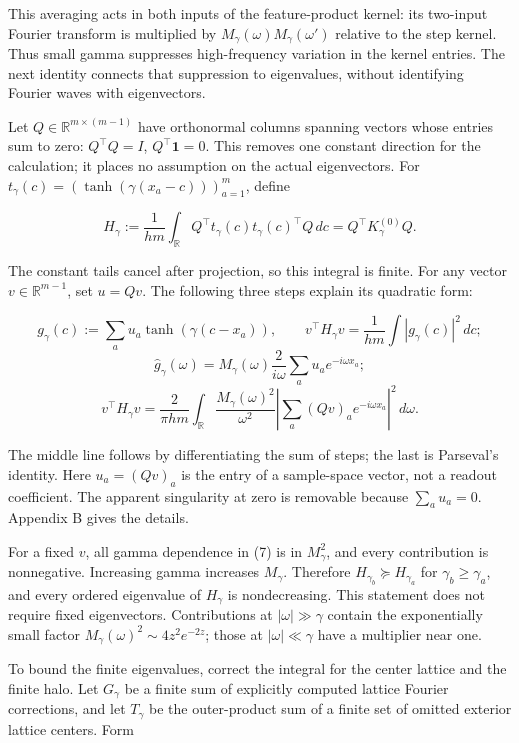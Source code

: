 \documentclass[11pt]{article}
\begin{document}
This averaging acts in both inputs of the feature-product kernel: its two-input Fourier transform is multiplied by \(M_\gamma(\omega)M_\gamma(\omega')\) relative to the step kernel. Thus small gamma suppresses high-frequency variation in the kernel entries. The next identity connects that suppression to eigenvalues, without identifying Fourier waves with eigenvectors.

Let \(Q\in\mathbb R^{m\times(m-1)}\) have orthonormal columns spanning vectors whose entries sum to zero: \(Q^\top Q=I\), \(Q^\top\mathbf1=0\). This removes one constant direction for the calculation; it places no assumption on the actual eigenvectors. For \(t_\gamma(c)=(\tanh(\gamma(x_a-c)))_{a=1}^{m}\), define

\[
H_\gamma:=\frac1{hm}\int_{\mathbb R}
Q^\top t_\gamma(c)t_\gamma(c)^\top Q\,dc
=Q^\top K_\gamma^{(0)}Q.
\]

The constant tails cancel after projection, so this integral is finite. For any vector \(v\in\mathbb R^{m-1}\), set \(u=Qv\). The following three steps explain its quadratic form:

\[
g_\gamma(c):=\sum_a u_a\tanh(\gamma(c-x_a)),
\qquad v^\top H_\gamma v=\frac1{hm}\int |g_\gamma(c)|^2\,dc;
\]
\[
\widehat g_\gamma(\omega)
=M_\gamma(\omega)\frac{2}{i\omega}
\sum_a u_a e^{-i\omega x_a};
\]
\[
\boxed{
v^\top H_\gamma v
=\frac2{\pi hm}\int_{\mathbb R}
\frac{M_\gamma(\omega)^2}{\omega^2}
\left|\sum_a (Qv)_a e^{-i\omega x_a}\right|^2\,d\omega.
}
\tag{7}
\]

The middle line follows by differentiating the sum of steps; the last is Parseval's identity. Here \(u_a=(Qv)_a\) is the entry of a sample-space vector, not a readout coefficient. The apparent singularity at zero is removable because \(\sum_a u_a=0\). Appendix B gives the details.

For a fixed \(v\), all gamma dependence in (7) is in \(M_\gamma^2\), and every contribution is nonnegative. Increasing gamma increases \(M_\gamma\). Therefore \(H_{\gamma_b}\succeq H_{\gamma_a}\) for \(\gamma_b\ge\gamma_a\), and every ordered eigenvalue of \(H_\gamma\) is nondecreasing. This statement does not require fixed eigenvectors. Contributions at \(|\omega|\gg\gamma\) contain the exponentially small factor \(M_\gamma(\omega)^2\sim4z^2e^{-2z}\); those at \(|\omega|\ll\gamma\) have a multiplier near one.

To bound the finite eigenvalues, correct the integral for the center lattice and the finite halo. Let \(G_\gamma\) be a finite sum of explicitly computed lattice Fourier corrections, and let \(T_\gamma\) be the outer-product sum of a finite set of omitted exterior lattice centers. Form
\end{document}
